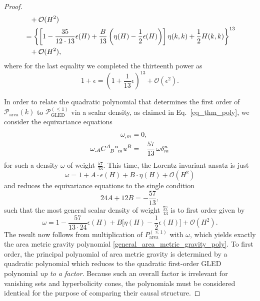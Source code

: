 \begin{proof}
\begin{equation}
\begin{aligned}
                              &{} \hphantom{=} + \mathcal O(H^2) \\
                              &{} = \left\{ \left\lbrack 1 - \frac{35}{12\cdot 13} \epsilon(H) + \frac{B}{13}\left(\eta(H) - \frac{1}{2}\epsilon(H) \right)\right\rbrack \eta(k,k) + \frac{1}{2} H(k,k) \right\}^{13} \\
                              &{} \hphantom{=} + \mathcal O(H^2),
  \end{aligned}
\end{equation}
where for the last equality we completed the thirteenth power as
\begin{equation}
  1 + \epsilon = \left( 1 + \frac{1}{13}\epsilon\right)^{13} + \mathcal O(\epsilon^2).
\end{equation}

In order to relate the quadratic polynomial that determines the first order of $\mathcal P_\text{area}(k)$ to $\mathcal P_\text{GLED}^{(\leq 1)}$ via a scalar density, as claimed in Eq.~\eqref{eq_thm_poly}, we consider the equivariance equations
\begin{equation}
  \begin{aligned}
    \omega_{,m} &{} = 0, \\
    \omega_{:A} \gmc{A}{B}{n}{m} u^B &{} = -\frac{57}{13}\,\omega \delta^n_m
  \end{aligned}
\end{equation}
for such a density $\omega$ of weight $\frac{57}{13}$. This time, the Lorentz invariant ansatz is just
\begin{equation}
  \omega = 1 + A\cdot \epsilon(H) + B\cdot \eta(H) + \mathcal O(H^2)
\end{equation}
and reduces the equivariance equations to the single condition
\begin{equation}
  24A + 12B = -\frac{57}{13},
\end{equation}
such that the most general scalar density of weight $\frac{57}{13}$ is to first order given by
\begin{equation}
  \omega = 1 - \frac{57}{13\cdot 24} \epsilon(H) + B \lbrack \eta(H) - \frac{1}{2} \epsilon(H)\rbrack + \mathcal O(H^2).
\end{equation}
The result now follows from multiplication of $P_\text{area}^{(\leq 1)}$ with $\omega$, which yields exactly the area metric gravity polynomial \eqref{general_area_metric_gravity_poly}. To first order, the principal polynomial of area metric gravity is determined by a quadratic polynomial which reduces to the quadratic first-order GLED polynomial \emph{up to a factor}. Because such an overall factor is irrelevant for vanishing sets and hyperbolicity cones, the polynomials must be considered identical for the purpose of comparing their causal structure.
\end{proof}


